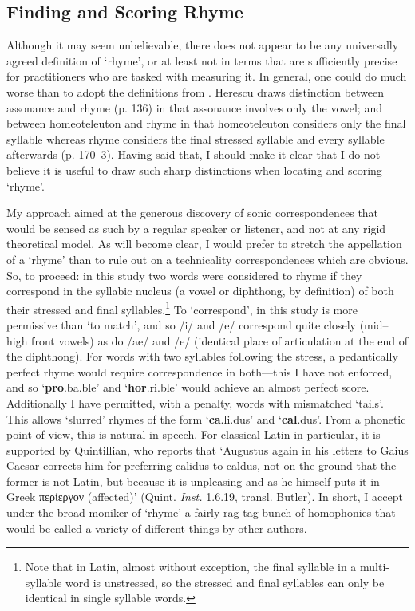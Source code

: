 \documentclass[twocolumn, switch]{article} %
\newcommand{\textgreek}[1]{\begingroup\fontencoding{LGR}\selectfont#1\endgroup}
\begin{document}
\subsection{Finding and Scoring Rhyme}
\label{sec:findscore}

Although it may seem unbelievable, there does not appear to be any universally
agreed definition of `rhyme', or at least not in terms that are sufficiently
precise for practitioners who are tasked with measuring it. In general, one
could do much worse than to adopt the definitions from
. Herescu draws distinction between assonance and
rhyme (p. 136) in that assonance involves only the vowel; and between
homeoteleuton and rhyme in that homeoteleuton considers only the final
syllable whereas rhyme considers the final stressed syllable and every
syllable afterwards (p. 170--3). Having said that, I should make it clear that
I do not believe it is useful to draw such sharp distinctions when locating
and scoring `rhyme'.

My approach aimed at the generous discovery of sonic correspondences that
would be sensed as such by a regular speaker or listener, and not at any rigid
theoretical model. As will become clear, I would prefer to stretch the
appellation of a `rhyme' than to rule out on a technicality correspondences
which are obvious. So, to proceed: in this study two words were considered to
rhyme if they correspond in the syllabic nucleus (a vowel or diphthong, by
definition) of both their stressed and final syllables.\footnote{
  Note that in Latin, almost without exception, the final syllable in a
  multi-syllable word is unstressed, so the stressed and final syllables
  can only be identical in single syllable words. 
}
To `correspond', in this study is more permissive than `to match', and so /i/
and /e/ correspond quite closely (mid--high front vowels) as do /ae/ and /e/
(identical place of articulation at the end of the diphthong). For words with
two syllables following the stress, a pedantically perfect rhyme would require
correspondence in both---this I have not enforced, and so
`\textbf{pro}.ba.ble' and `\textbf{hor}.ri.ble' would achieve an almost
perfect score. Additionally I have permitted, with a penalty, words with
mismatched `tails'. This allows `slurred' rhymes of the form
`\textbf{ca}.li.dus' and `\textbf{cal}.dus'. From a phonetic point of view,
this is natural in speech. For classical Latin in particular, it is supported
by Quintillian, who reports that `Augustus again in his letters to Gaius
Caesar corrects him for preferring calidus to caldus, not on the ground that
the former is not Latin, but because it is unpleasing and as he himself puts
it in Greek \textgreek{περίεργον} (affected)' (Quint. \emph{Inst.} 1.6.19,
transl. Butler). In short, I accept under the broad moniker of `rhyme' a
fairly rag-tag bunch of homophonies that would be called a variety of
different things by other authors.
\end{document}
